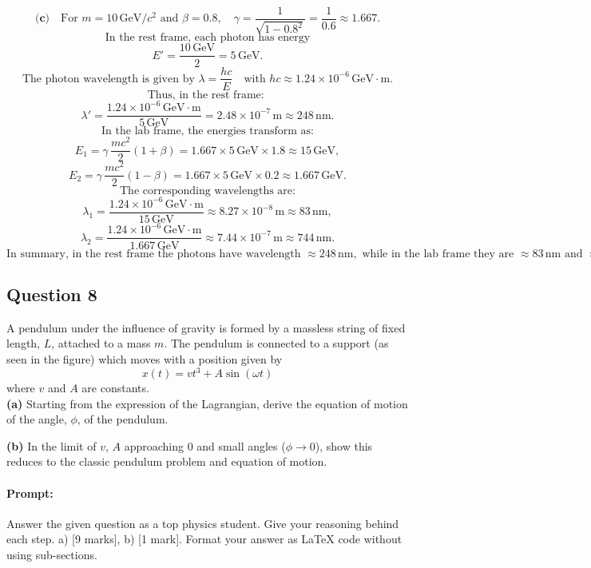 \documentclass{article}
\begin{document}
\[
\textbf{(c)}\quad \text{For } m = 10\,\mathrm{GeV}/c^2 \text{ and } \beta=0.8,\quad \gamma=\frac{1}{\sqrt{1-0.8^2}}=\frac{1}{0.6}\approx 1.667.
\]
\[
\text{In the rest frame, each photon has energy}
\]
\[
E'=\frac{10\,\mathrm{GeV}}{2}=5\,\mathrm{GeV}.
\]
\[
\text{The photon wavelength is given by } \lambda=\frac{hc}{E}\quad \text{with } hc\approx1.24\times10^{-6}\,\mathrm{GeV\cdot m}.
\]
\[
\text{Thus, in the rest frame: }
\]
\[
\lambda'=\frac{1.24\times10^{-6}\,\mathrm{GeV\cdot m}}{5\,\mathrm{GeV}}=2.48\times10^{-7}\,\mathrm{m}\approx248\,\mathrm{nm}.
\]
\[
\text{In the lab frame, the energies transform as:}
\]
\[
E_1=\gamma\,\frac{m c^2}{2}(1+\beta)=1.667\times5\,\mathrm{GeV}\times1.8\approx15\,\mathrm{GeV},
\]
\[
E_2=\gamma\,\frac{m c^2}{2}(1-\beta)=1.667\times5\,\mathrm{GeV}\times0.2\approx1.667\,\mathrm{GeV}.
\]
\[
\text{The corresponding wavelengths are:}
\]
\[
\lambda_1=\frac{1.24\times10^{-6}\,\mathrm{GeV\cdot m}}{15\,\mathrm{GeV}}\approx8.27\times10^{-8}\,\mathrm{m}\approx83\,\mathrm{nm},
\]
\[
\lambda_2=\frac{1.24\times10^{-6}\,\mathrm{GeV\cdot m}}{1.667\,\mathrm{GeV}}\approx7.44\times10^{-7}\,\mathrm{m}\approx744\,\mathrm{nm}.
\]
\[
\text{In summary, in the rest frame the photons have wavelength } \approx248\,\mathrm{nm}, \text{ while in the lab frame they are } \approx83\,\mathrm{nm} \text{ and } \approx744\,\mathrm{nm} \text{ for the forward and backward moving photons, respectively.}
\]

\subsection{Question 8}

A pendulum under the influence of gravity is formed by a massless string of fixed length, $L$, attached to a mass $m$. The pendulum is connected to a support (as seen in the figure) which moves with a position given by
\[
x(t) = vt^3 + A\sin(\omega t)
\]
where $v$ and $A$ are constants. \\

\textbf{(a)} Starting from the expression of the Lagrangian, derive the equation of motion of the angle, $\phi$, of the pendulum.


\textbf{(b)} In the limit of $v$, $A$ approaching 0 and small angles ($\phi \to 0$), show this reduces to the classic pendulum problem and equation of motion.

\paragraph{Prompt: \\} 
Answer the given question as a top physics student. Give your reasoning behind each step. a) [9 marks], b) [1 mark].
Format your answer as LaTeX code without using sub-sections.
\end{document}
